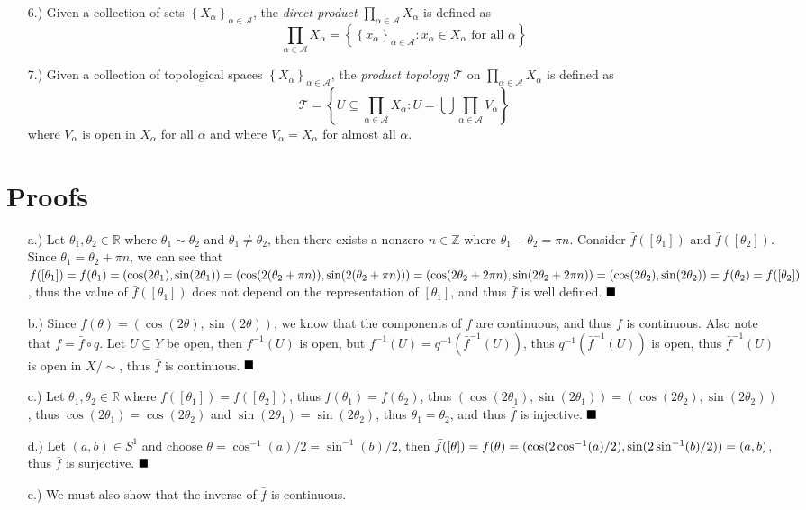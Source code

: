 \documentclass[12pt]{article}
\newcommand{\done}{
    \ensuremath{\strut\hfill\blacksquare}
}
\newcommand{\braces}[1]{\left\{#1\right\}}           %
\newcommand{\parens}[1]{\left(#1\right)}             %
\newcommand{\Z}{\mathbb{Z}}
\newcommand{\R}{\mathbb{R}}
\begin{document}
\begin{itemize}
    \item [6.)] Given a collection of sets $\braces{X_\alpha}_{\alpha\in\mathcal{A}}$, the \textit{direct product} $\displaystyle\prod_{\alpha\in\mathcal{A}}X_\alpha$ is defined as
    \[\prod_{\alpha\in\mathcal{A}}X_\alpha=\braces{\braces{x_\alpha}_{\alpha\in\mathcal{A}}:x_\alpha\in X_\alpha\text{ for all }\alpha}\]

    \item [7.)] Given a collection of topological spaces $\braces{X_\alpha}_{\alpha\in\mathcal{A}}$, the \textit{product topology} $\mathcal{T}$ on $\displaystyle\prod_{\alpha\in\mathcal{A}}X_\alpha$ is defined as
    \[\mathcal{T}=\braces{U\subseteq\prod_{\alpha\in\mathcal{A}}X_\alpha:U=\bigcup\prod_{\alpha\in\mathcal{A}}V_\alpha}\]
    where $V_\alpha$ is open in $X_\alpha$ for all $\alpha$ and where $V_\alpha=X_\alpha$ for almost all $\alpha$.
\end{itemize}

\section*{Proofs}
\begin{itemize}
    \item [a.)] Let $\theta_1,\theta_2\in\R$ where $\theta_1\sim\theta_2$ and $\theta_1\ne\theta_2$, then there exists a nonzero $n\in\Z$ where $\theta_1-\theta_2=\pi n$. Consider $\bar{f}([\theta_1])$ and $\bar{f}([\theta_2])$. Since $\theta_1=\theta_2+\pi n$, we can see that $f([\theta_1])=f(\theta_1)=\parens{\cos(2\theta_1),\sin(2\theta_1)}=(\cos(2(\theta_2+\pi n)),\sin(2(\theta_2+\pi n)))=\break(\cos(2\theta_2+2\pi n),\sin(2\theta_2+2\pi n))=(\cos(2\theta_2),\sin(2\theta_2))=f(\theta_2)=f([\theta_2])$, thus the value of $\bar f([\theta_1])$ does not depend on the representation of $[\theta_1]$, and thus $\bar f$ is well defined.\done

    \item [b.)] Since $f(\theta)=(\cos(2\theta),\sin(2\theta))$, we know that the components of $f$ are continuous, and thus $f$ is continuous. Also note that $f=\bar f\circ q$. Let $U\subseteq Y$ be open, then $f^{-1}(U)$ is open, but $f^{-1}(U)=q^{-1}(\bar f^{-1}(U))$, thus $q^{-1}(\bar f^{-1}(U))$ is open, thus $\bar f^{-1}(U)$ is open in $X/{\sim}$, thus $\bar f$ is continuous.\done

    \item [c.)] Let $\theta_1,\theta_2\in\R$ where $f([\theta_1])=f([\theta_2])$, thus $f(\theta_1)=f(\theta_2)$, thus $(\cos(2\theta_1),\sin(2\theta_1))=(\cos(2\theta_2),\sin(2\theta_2))$, thus $\cos(2\theta_1)=\cos(2\theta_2)$ and $\sin(2\theta_1)=\sin(2\theta_2)$, thus $\theta_1=\theta_2$, and thus $\bar f$ is injective.\done

    \item [d.)] Let $(a,b)\in S^1$ and choose $\theta=\cos^{-1}(a)/2=\sin^{-1}(b)/2$, then $\bar f([\theta])=f(\theta)=\break(\cos(2\cos^{-1}(a)/2),\sin(2\sin^{-1}(b)/2))=(a,b)$, thus $\bar f$ is surjective.\done

    \item [e.)] We must also show that the inverse of $\bar f$ is continuous.
\end{itemize}
\end{document}
